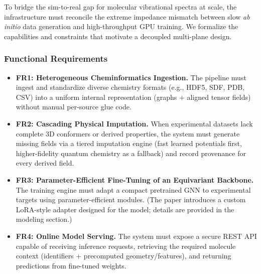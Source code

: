 \documentclass[10pt]{article}
\begin{document}
To bridge the sim-to-real gap for molecular vibrational spectra at scale, the infrastructure must reconcile the extreme impedance mismatch between slow \textit{ab initio} data generation and high-throughput GPU training. We formalize the capabilities and constraints that motivate a decoupled multi-plane design.

\subsubsection*{Functional Requirements}
\begin{itemize}
\item \textbf{FR1: Heterogeneous Cheminformatics Ingestion.} The pipeline must ingest and standardize diverse chemistry formats (e.g., HDF5, SDF, PDB, CSV) into a uniform internal representation (graphs + aligned tensor fields) without manual per-source glue code.

\item \textbf{FR2: Cascading Physical Imputation.} When experimental datasets lack complete 3D conformers or derived properties, the system must generate missing fields via a tiered imputation engine (fast learned potentials first, higher-fidelity quantum chemistry as a fallback) and record provenance for every derived field.

\item \textbf{FR3: Parameter-Efficient Fine-Tuning of an Equivariant Backbone.} The training engine must adapt a compact pretrained GNN to experimental targets using parameter-efficient modules. (The paper introduces a custom LoRA-style adapter designed for the model; details are provided in the modeling section.)

\item \textbf{FR4: Online Model Serving.} The system must expose a secure REST API capable of receiving inference requests, retrieving the required molecule context (identifiers + precomputed geometry/features), and returning predictions from fine-tuned weights.

\end{itemize}
\end{document}
